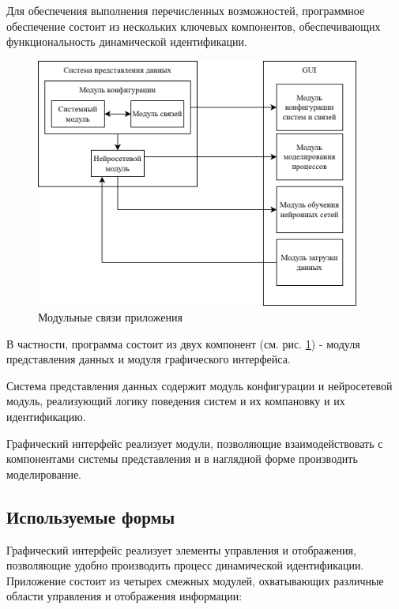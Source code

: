 Для обеспечения выполнения перечисленных возможностей, программное обеспечение
состоит из нескольких ключевых компонентов, обеспечивающих функциональность
динамической идентификации. 

\begin{figure}[H]
  \begin{center}
    \includegraphics[width=0.95\textwidth]{figures/modules/relations.png}
  \end{center}
  \caption{Модульные связи приложения}\label{fig:modules:relation}
\end{figure}

В частности, программа состоит из двух компонент (см. рис.
\ref{fig:modules:relation}) - модуля представления данных и модуля графического
интерфейса. 

Система представления данных содержит модуль конфигурации и нейросетевой модуль,
реализующий логику поведения систем и их компановку и их идентификацию.

Графический интерфейс реализует модули, позволяющие взаимодействовать с
компонентами системы представления и в наглядной форме производить
моделирование. 

\subsection{Используемые формы}

Графический интерфейс реализует элементы управления и отображения, позволяющие
удобно производить процесс динамической идентификации. Приложение состоит из
четырех смежных модулей, охватывающих различные области управления и отображения
информации:


